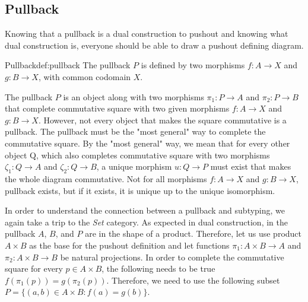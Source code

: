 \subsection{Pullback}
Knowing that a pullback is a dual construction to pushout and knowing what dual construction is, everyone should be able to draw a pushout defining diagram.
\begin{defi}{Pullback}{def:pullback}
The pullback \cite{CategoryTheory} $P$ is defined by two morphisms $f: A \rightarrow X$ and $g: B \rightarrow X$, with common codomain $X$.
\begin{center}
\end{center}
The pullback $P$ is an object along with two morphisms $\pi_1: P \rightarrow A$ and $\pi_2: P \rightarrow B$ that complete commutative square with two given morphisms $f: A \rightarrow X$ and $g: B \rightarrow X$. However, not every object that makes the square commutative is a pullback. The pullback must be the "most general" way to complete the commutative square. By the "most general" way, we mean that for every other object Q, which also completes commutative square with two morphisms $\zeta_1: Q \rightarrow A$ and $\zeta_2: Q \rightarrow B$, a unique morphism $u: Q \rightarrow P$ must exist that makes the whole diagram commutative. Not for all morphisms $f: A \rightarrow X$ and $g: B \rightarrow X$, pullback exists, but if it exists, it is unique up to the unique isomorphism.
\end{defi}
In order to understand the connection between a pullback and subtyping, we again take a trip to the \emph{Set} category. As expected in dual construction, in the pullback $A$, $B$, and $P$ are in the shape of a product. Therefore, let us use product $A \times B$ as the base for the pushout definition and let functions $\pi_1: A \times B \rightarrow A$ and $\pi_2: A \times B \rightarrow B$ be natural projections. In order to complete the commutative square for every $p \in A \times B$, the following needs to be true $f (\pi_1 (p)) = g (\pi_2(p))$. Therefore, we need to use the following subset $P = \{(a, b) \in A \times B : f(a) = g(b)\}$. 

